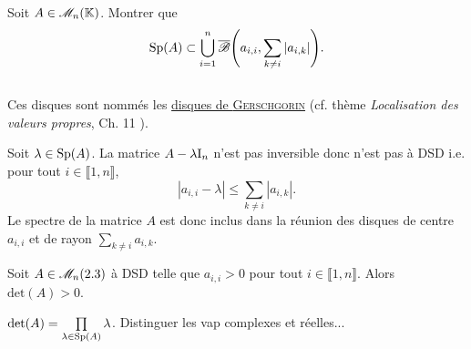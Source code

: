 \begin{theo}
    Soit $A \in \mathscr{M}_n(\mathbb{K})$. Montrer que $$\mathrm{Sp}(A) \subset \bigcup\limits_{i=1}^{n} \overline{\mathscr{B}} \Bigg( a_{i,i}, \sum\limits_{k \not = i} |a_{i,k}| \Bigg).$$ \\
    Ces disques sont nommés les \href{https://fr.wikipedia.org/wiki/Théorème_de_Gerschgorin}{disques de \textsc{Gerschgorin}} (cf. thème \textit{Localisation des valeurs propres}, Ch. 11 \cite{acamanes}).
\end{theo}

\begin{preuve}
    Soit $\lambda \in \mathrm{Sp}(A)$. La matrice $A - \lambda \mathrm{I}_n$ n'est pas inversible donc n'est pas à DSD i.e. pour tout $i \in \llbracket 1, n \rrbracket$,
    $$|a_{i,i} - \lambda| \leqslant \sum_{k \not= i} |a_{i,k}|.$$
    Le spectre de la matrice $A$ est donc inclus dans la réunion des disques de centre $a_{i,i}$ et de rayon $\sum\limits_{k \not=i} a_{i,k}$.
\end{preuve}    

\begin{prop}
    Soit $A \in \mathscr{M}_n(2.3)$ à DSD telle que $a_{i,i} > 0$ pour tout $i \in \llbracket 1, n \rrbracket$. Alors $\mathrm{det}(A) > 0$. 
\end{prop}

\begin{preuve}
        $\det(A) = \prod\limits_{\lambda \in \mathrm{Sp}(A)} \lambda$. Distinguer les vap complexes et réelles...
\end{preuve}
